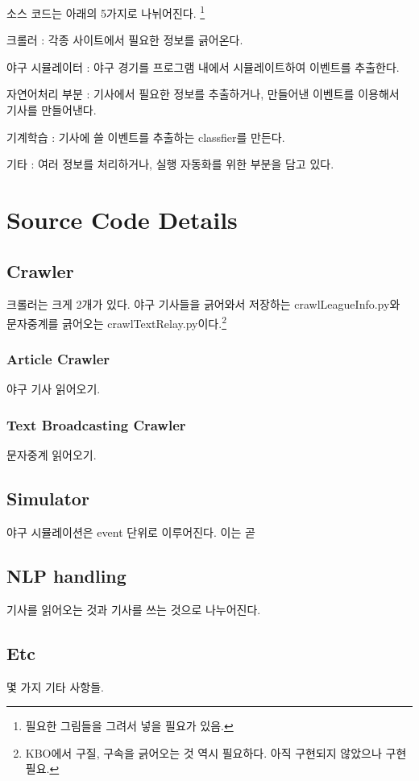 \documentclass[twoside]{article}
\begin{document}
소스 코드는 아래의 5가지로 나뉘어진다. \footnote{필요한 그림들을 그려서 넣을 필요가 있음.}

\begin{compactitem}
\item 크롤러 : 각종 사이트에서 필요한 정보를 긁어온다. 
\item 야구 시뮬레이터 : 야구 경기를 프로그램 내에서 시뮬레이트하여 이벤트를 추출한다. 
\item 자연어처리 부분 : 기사에서 필요한 정보를 추출하거나, 만들어낸 이벤트를 이용해서 기사를 만들어낸다.
\item 기계학습 : 기사에 쓸 이벤트를 추출하는 classfier를 만든다.
\item 기타 : 여러 정보를 처리하거나, 실행 자동화를 위한 부분을 담고 있다.  
\end{compactitem}

\section{Source Code Details}

\subsection{Crawler}

크롤러는 크게 2개가 있다. 야구 기사들을 긁어와서 저장하는 crawlLeagueInfo.py와 문자중계를 긁어오는 crawlTextRelay.py이다.\footnote{KBO에서 구질, 구속을 긁어오는 것 역시 필요하다. 아직 구현되지 않았으나 구현 필요.} 

\subsubsection{Article Crawler}

야구 기사 읽어오기. 

\subsubsection{Text Broadcasting Crawler}

문자중계 읽어오기.

\subsection{Simulator}

야구 시뮬레이션은 event 단위로 이루어진다. 이는 곧

\subsection{NLP handling}

기사를 읽어오는 것과 기사를 쓰는 것으로 나누어진다. 

\subsection{Etc}  

몇 가지 기타 사항들. 
\end{document}
